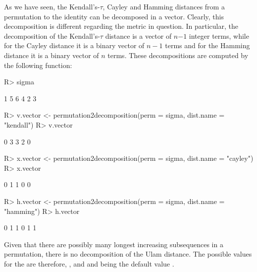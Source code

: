 \documentclass[article,nojss]{jss}
\begin{document}
As we have seen, the Kendall's-$\tau$, Cayley and Hamming distances from a permutation to the identity can be decomposed in a vector. Clearly, this decomposition is different regarding the metric in question. In particular, the decomposition of the Kendall's-$\tau$ distance is a vector of $n$$-1$ integer terms, while for the Cayley distance it is a binary vector of $n-1$ terms and for the Hamming distance it is a binary vector of $n$ terms. These decompositions are computed by the following function:
\begin{Schunk}
\begin{Sinput}
R> sigma
\end{Sinput}
\begin{Soutput}
[1] 1 5 6 4 2 3
\end{Soutput}
\begin{Sinput}
R> v.vector <- permutation2decomposition(perm = sigma, dist.name = "kendall")
R> v.vector
\end{Sinput}
\begin{Soutput}
[1] 0 3 3 2 0
\end{Soutput}
\begin{Sinput}
R> x.vector <- permutation2decomposition(perm = sigma, dist.name = "cayley")
R> x.vector
\end{Sinput}
\begin{Soutput}
[1] 0 1 1 0 0
\end{Soutput}
\begin{Sinput}
R> h.vector <- permutation2decomposition(perm = sigma, dist.name = "hamming")
R> h.vector
\end{Sinput}
\begin{Soutput}
[1] 0 1 1 0 1 1
\end{Soutput}
\end{Schunk}

Given that there are possibly many longest increasing subsequences in a permutation, there is no decomposition of the Ulam distance. The possible values for the  are therefore, ,  and  and being the default value . 
\end{document}
